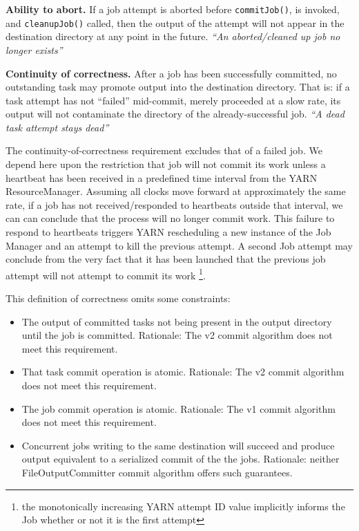 \documentclass[conference]{IEEEtran}
\begin{document}
\begin{paragraph}
  \textbf{Ability to abort.}
  If a job attempt is aborted before \texttt{commitJob()}, is invoked, and
  \texttt{cleanupJob()} called, then the output of the attempt will not appear in the
  destination directory at any point in the future.
  \emph{``An aborted/cleaned up job no longer exists''}
\end{paragraph}


\begin{paragraph}
  \textbf{Continuity of correctness.}
  After a job has been successfully committed, no outstanding task may promote
  output into the destination directory.
  That is: if a task attempt has not ``failed'' mid-commit, merely proceeded at a slow rate,
  its output will not contaminate the directory of the already-successful job.
  \emph{``A dead task attempt stays dead''}
\end{paragraph}


The continuity-of-correctness requirement excludes that of a failed job.
We depend here upon the restriction that job will not commit its work unless
a heartbeat has been received in a predefined time interval from the YARN ResourceManager.
Assuming all clocks move forward at approximately the same rate, if a job has
not received/responded to heartbeats outside that interval,
we can can conclude that the process will no longer commit work.
This failure to respond to heartbeats triggers YARN rescheduling a new
instance of the Job Manager and an attempt to kill the previous attempt.
A second Job attempt may conclude from the very fact that it has been launched
that the previous job attempt will not attempt to commit its work
\footnote{the monotonically increasing YARN attempt ID value implicitly
informs the Job whether or not it is the first attempt}.

This definition of correctness omits some constraints:

\begin{itemize}
  \item The output of committed tasks not being present in the output directory
  until the job is committed.
  Rationale: The v2 commit algorithm does not meet this requirement.

  \item That task commit operation is atomic.
  Rationale: The v2 commit algorithm does not meet this requirement.

  \item The job commit operation is atomic.
  Rationale: The v1 commit algorithm does not meet this requirement.

  \item Concurrent jobs writing to the same destination will succeed and
  produce output equivalent to a serialized commit of the the jobs.
  Rationale: neither FileOutputCommitter commit algorithm offers such guarantees.
\end{itemize}
\end{document}
